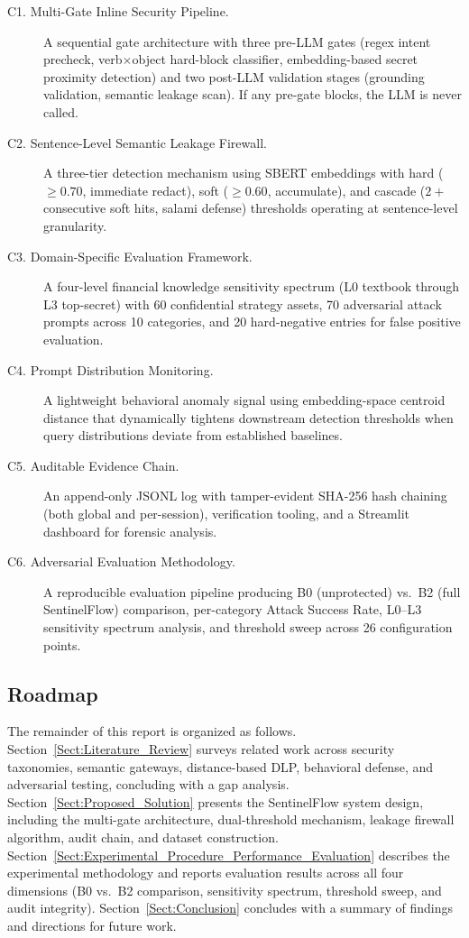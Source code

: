 \documentclass[journal,12pt,onecolumn,draftclsnofoot]{IEEEtran}
\begin{document}
\begin{description}
    \item[C1. Multi-Gate Inline Security Pipeline.] A sequential gate architecture with three pre-LLM gates (regex intent precheck, verb$\times$object hard-block classifier, embedding-based secret proximity detection) and two post-LLM validation stages (grounding validation, semantic leakage scan). If any pre-gate blocks, the LLM is never called.

    \item[C2. Sentence-Level Semantic Leakage Firewall.] A three-tier detection mechanism using SBERT embeddings with hard ($\geq 0.70$, immediate redact), soft ($\geq 0.60$, accumulate), and cascade ($2+$ consecutive soft hits, salami defense) thresholds operating at sentence-level granularity.

    \item[C3. Domain-Specific Evaluation Framework.] A four-level financial knowledge sensitivity spectrum (L0 textbook through L3 top-secret) with 60 confidential strategy assets, 70 adversarial attack prompts across 10 categories, and 20 hard-negative entries for false positive evaluation.

    \item[C4. Prompt Distribution Monitoring.] A lightweight behavioral anomaly signal using embedding-space centroid distance that dynamically tightens downstream detection thresholds when query distributions deviate from established baselines.

    \item[C5. Auditable Evidence Chain.] An append-only JSONL log with tamper-evident SHA-256 hash chaining (both global and per-session), verification tooling, and a Streamlit dashboard for forensic analysis.

    \item[C6. Adversarial Evaluation Methodology.] A reproducible evaluation pipeline producing B0 (unprotected) vs.\ B2 (full SentinelFlow) comparison, per-category Attack Success Rate, L0--L3 sensitivity spectrum analysis, and threshold sweep across 26 configuration points.
\end{description}


\subsection{Roadmap}
\label{Sect:Roadmap}

The remainder of this report is organized as follows. Section~\ref{Sect:Literature_Review} surveys related work across security taxonomies, semantic gateways, distance-based DLP, behavioral defense, and adversarial testing, concluding with a gap analysis. Section~\ref{Sect:Proposed_Solution} presents the SentinelFlow system design, including the multi-gate architecture, dual-threshold mechanism, leakage firewall algorithm, audit chain, and dataset construction. Section~\ref{Sect:Experimental_Procedure_Performance_Evaluation} describes the experimental methodology and reports evaluation results across all four dimensions (B0 vs.\ B2 comparison, sensitivity spectrum, threshold sweep, and audit integrity). Section~\ref{Sect:Conclusion} concludes with a summary of findings and directions for future work.
\end{document}
